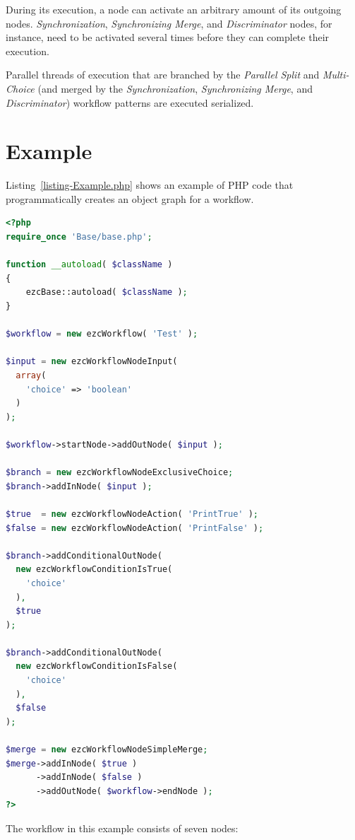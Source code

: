 During its execution, a node can activate an arbitrary amount of its outgoing
nodes. \emph{Synchronization}, \emph{Synchronizing Merge}, and
\emph{Discriminator} nodes, for instance, need to be activated several times
before they can complete their execution.

Parallel threads of execution that are branched by the \emph{Parallel Split}
and \emph{Multi-Choice} (and merged by the \emph{Synchronization},
\emph{Synchronizing Merge}, and \emph{Discriminator}) workflow patterns are
executed serialized.

\clearpage
\section{Example}
\label{section-Example}

Listing~\ref{listing-Example.php} shows an example of PHP code that
programmatically creates an object graph for a workflow.

\begin{lstlisting}[language=PHP,float,caption={Creating an object graph using the \emph{Workflow Definition API}},label=listing-Example.php]
<?php
require_once 'Base/base.php';

function __autoload( $className )
{
    ezcBase::autoload( $className );
}

$workflow = new ezcWorkflow( 'Test' );

$input = new ezcWorkflowNodeInput(
  array(
    'choice' => 'boolean'
  )
);

$workflow->startNode->addOutNode( $input );

$branch = new ezcWorkflowNodeExclusiveChoice;
$branch->addInNode( $input );

$true  = new ezcWorkflowNodeAction( 'PrintTrue' );
$false = new ezcWorkflowNodeAction( 'PrintFalse' );

$branch->addConditionalOutNode(
  new ezcWorkflowConditionIsTrue(
    'choice'
  ),
  $true
);

$branch->addConditionalOutNode(
  new ezcWorkflowConditionIsFalse(
    'choice'
  ),
  $false
);

$merge = new ezcWorkflowNodeSimpleMerge;
$merge->addInNode( $true )
      ->addInNode( $false )
      ->addOutNode( $workflow->endNode );
?>
\end{lstlisting}

The workflow in this example consists of seven nodes:

